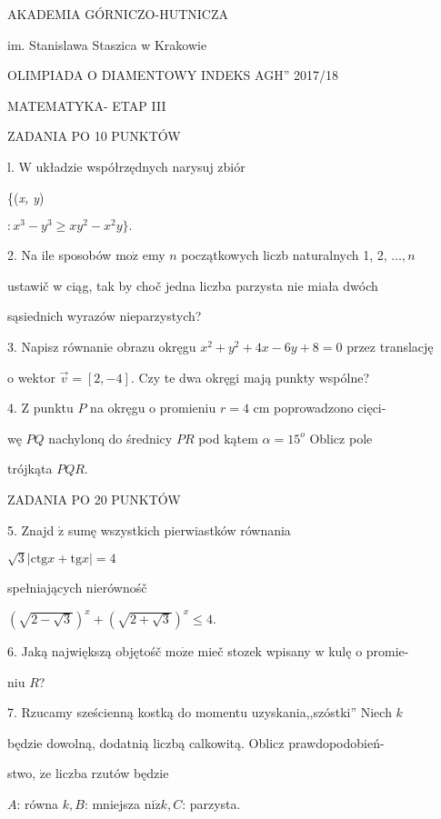 \documentclass[a4paper,12pt]{article}
\begin{document}
AKADEMIA GÓRNICZO-HUTNICZA

im. Stanislawa Staszica w Krakowie

OLIMPIADA O DIAMENTOWY INDEKS AGH'' 2017/18

MATEMATYKA- ETAP III

ZADANIA PO 10 PUNKTÓW

l. W układzie współrzędnych narysuj zbiór

\{({\it x, y})

$: x^{3}-y^{3}\geq xy^{2}-x^{2}y\}.$

2. Na ile sposobów $\mathrm{m}\mathrm{o}\dot{\mathrm{z}}$ emy $n$ początkowych liczb naturalnych 1, 2, $\ldots, n$

ustawič w ciąg, tak by choč jedna liczba parzysta nie miała dwóch

sąsiednich wyrazów nieparzystych?

3. Napisz równanie obrazu okręgu $x^{2}+y^{2}+4x-6y+8=0$ przez translację

o wektor $\vec{v}=[2,-4]$. Czy te dwa okręgi mają punkty wspólne?

4. $\mathrm{Z}$ punktu $P$ na okręgu o promieniu $r = 4$ cm poprowadzono cięci-

wę $PQ$ nachylonq do średnicy $PR$ pod kątem $\alpha = 15^{o}$ Oblicz pole

trójkąta $PQR.$

ZADANIA PO 20 PUNKTÓW

5. Znajd $\acute{\mathrm{z}}$ sumę wszystkich pierwiastków równania

$\sqrt{3}|\mathrm{c}\mathrm{t}\mathrm{g}x+\mathrm{t}\mathrm{g}x|=4$

spełniających nierównośč

$(\sqrt{2-\sqrt{3}})^{x}+(\sqrt{2+\sqrt{3}})^{x}\leq 4.$

6. Jaką największą objętośč $\mathrm{m}\mathrm{o}\dot{\mathrm{z}}\mathrm{e}$ mieč stozek wpisany w kulę o promie-

niu $R$?

7. Rzucamy sześcienną kostką do momentu uzyskania,,szóstki'' Niech $k$

będzie dowolną, dodatnią liczbą calkowitą. Oblicz prawdopodobień-

stwo, $\dot{\mathrm{z}}\mathrm{e}$ liczba rzutów będzie

$A$: równa $k, B$: mniejsza $\mathrm{n}\mathrm{i}\dot{\mathrm{z}}k, C$: parzysta.
\end{document}
